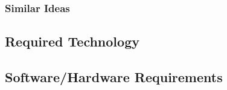 \documentclass{extarticle}
\begin{document}
\subsubsection{Similar Ideas}

\subsection{Required Technology}


\subsection{Software/Hardware Requirements}
\end{document}
